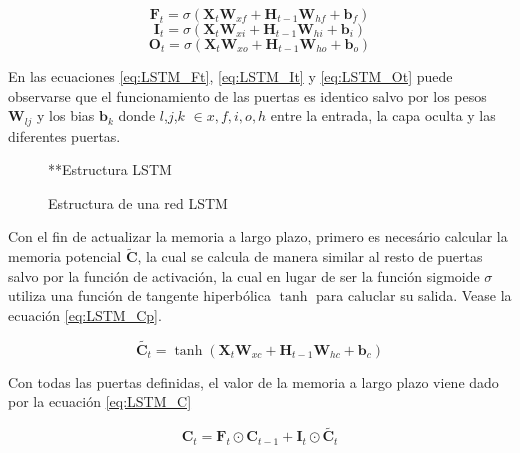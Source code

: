 \documentclass[a4paper,12pt]{article}
\begin{document}
\begin{equation}
    \mathbf{F}_{t} = \sigma\left(
        \mathbf{X}_{t}\mathbf{W}_{xf} +
        \mathbf{H}_{t-1}\mathbf{W}_{hf} + 
        \mathbf{b}_{f}
    \right)
    \label{eq:LSTM_Ft}
\end{equation}
\begin{equation}
    \mathbf{I}_{t} = \sigma\left(
        \mathbf{X}_{t}\mathbf{W}_{xi} +
        \mathbf{H}_{t-1}\mathbf{W}_{hi} + 
        \mathbf{b}_{i}
    \right)
    \label{eq:LSTM_It}
\end{equation}
\begin{equation}
    \mathbf{O}_{t} = \sigma\left(
        \mathbf{X}_{t}\mathbf{W}_{xo} +
        \mathbf{H}_{t-1}\mathbf{W}_{ho} + 
        \mathbf{b}_{o}
    \right)
    \label{eq:LSTM_Ot}
\end{equation}

En las ecuaciones \ref{eq:LSTM_Ft}, \ref{eq:LSTM_It} y 
\ref{eq:LSTM_Ot} puede observarse que el funcionamiento
de las puertas es identico salvo por los pesos 
$\mathbf{W}_{lj}$ y los bias $\mathbf{b}_{k}$ donde 
$l$,$j$,$k$ $\in x,f,i,o,h$ entre la entrada, la capa
oculta y las diferentes puertas.

\begin{figure}[h]
    \centering
    **Estructura LSTM
    \caption{Estructura de una red LSTM}
    \label{fig:LSTM}
\end{figure}

Con el fin de actualizar la memoria a largo plazo, primero
es necesário calcular la memoria potencial 
$\tilde{\mathbf{C}}$, la cual se calcula de manera
similar al resto de puertas salvo por la función de 
activación, la cual en lugar de ser la función sigmoide
$\sigma$ utiliza una función de tangente hiperbólica
$\tanh$ para caluclar su salida. Vease la ecuación
\ref{eq:LSTM_Cp}.

\begin{equation}
    \tilde{\mathbf{C}_{t}} = \tanh\left(
        \mathbf{X}_{t}\mathbf{W}_{xc} +
        \mathbf{H}_{t-1}\mathbf{W}_{hc} + 
        \mathbf{b}_{c}
    \right)
    \label{eq:LSTM_Cp}
\end{equation}

Con todas las puertas definidas, el valor de la memoria a 
largo plazo viene dado por la ecuación \ref{eq:LSTM_C}

\begin{equation}
    \mathbf{C}_{t} = \mathbf{F}_{t} \odot \mathbf{C}_{t-1}
    + \mathbf{I}_{t} \odot \tilde{\mathbf{C}_{t}}
    \label{eq:LSTM_C}
\end{equation}
\end{document}
